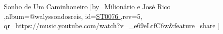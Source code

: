 \beginsong
{Sonho de Um Caminhoneiro %
}[by={Milionário e José Rico %
},album={@walyssondosreis},
id={\href{https://music.youtube.com/watch?v=_e69eLtfC6w&feature=share %
}{ST0076 %
}},rev={5}, %
qr={https://music.youtube.com/watch?v=_e69eLtfC6w&feature=share %
}]
\beginverse
